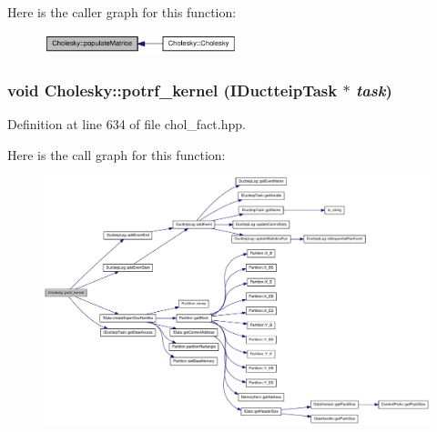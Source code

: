Here is the caller graph for this function:\nopagebreak
\begin{figure}[H]
\begin{center}
\leavevmode
\includegraphics[width=160pt]{class_cholesky_ae5281abaa5b986b2dc88fff04aed959c_icgraph}
\end{center}
\end{figure}
\hypertarget{class_cholesky_a603fc15661c381e10c8f1fc535ec48e5}{
\subsubsection[{potrf\_\-kernel}]{\setlength{\rightskip}{0pt plus 5cm}void Cholesky::potrf\_\-kernel ({\bf IDuctteipTask} $\ast$ {\em task})}}
\label{class_cholesky_a603fc15661c381e10c8f1fc535ec48e5}


Definition at line 634 of file chol\_\-fact.hpp.

Here is the call graph for this function:\nopagebreak
\begin{figure}[H]
\begin{center}
\leavevmode
\includegraphics[width=420pt]{class_cholesky_a603fc15661c381e10c8f1fc535ec48e5_cgraph}
\end{center}
\end{figure}


